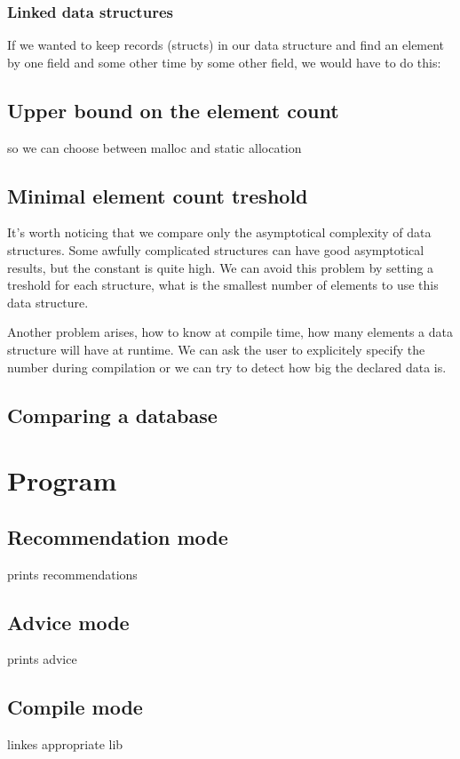\documentclass[11pt]{article}
\begin{document}
		\subsubsection{Linked data structures}
			If we wanted to keep records (structs) in our data structure and find an element by one field and some other time by some other field, we would
			have to do this:
	\subsection{Upper bound on the element count}
		so we can choose between malloc and static allocation
	\subsection{Minimal element count treshold}
		It's worth noticing that we compare only the asymptotical complexity of data structures. Some awfully complicated structures can have good
		asymptotical results, but the constant is quite high. We can avoid this problem by setting a treshold for each structure, what is the smallest
		number of elements to use this data structure.

		Another problem arises, how to know at compile time, how many elements a data structure will have at runtime. We can ask the user to explicitely
		specify the number during compilation or we can try to detect how big the declared data is.
	\subsection{Comparing a database}
		\label{sub:database}
\section{Program}
	\subsection{Recommendation mode}
		prints recommendations
	\subsection{Advice mode}
		prints advice
	\subsection{Compile mode}
		linkes appropriate lib
\end{document}
